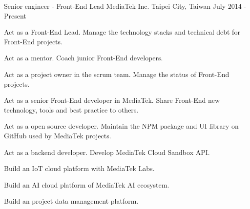

\begin{cventries}

  \cventry
    {Senior engineer - Front-End Lead} %
    {MediaTek Inc.} %
    {Taipei City, Taiwan} %
    {July 2014 - Present} %
    {
      \begin{cvitems} %
        \item {Act as a Front-End Lead. Manage the technology stacks and technical debt for Front-End projects.}
        \item {Act as a mentor. Coach junior Front-End developers.}
        \item {Act as a project owner in the scrum team. Manage the status of Front-End projects.}
        \item {Act as a senior Front-End developer in MediaTek. Share Front-End new technology, tools and best practice to others.}
        \item {Act as a open source developer. Maintain the NPM package and UI library on GitHub used by MediaTek projects.}
        \item {Act as a backend developer. Develop MediaTek Cloud Sandbox API.}
        \item {Build an IoT cloud platform with MediaTek Labs.}
        \item {Build an AI cloud platform of MediaTek AI ecosystem.}
        \item {Build an project data management platform.}
      \end{cvitems}
    }



\end{cventries}
